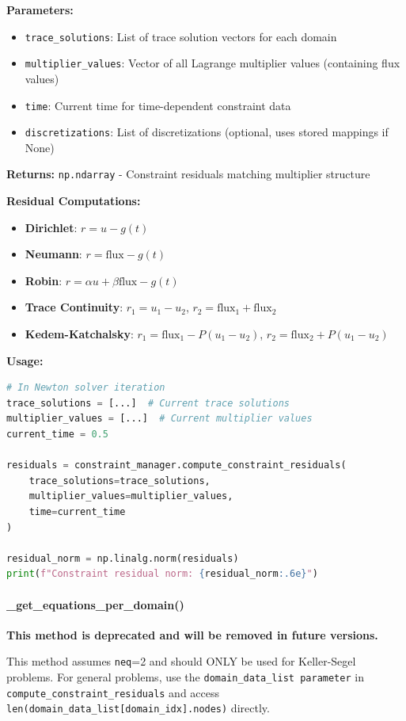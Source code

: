 \textbf{Parameters:}
\begin{itemize}
    \item \texttt{trace\_solutions}: List of trace solution vectors for each domain
    \item \texttt{multiplier\_values}: Vector of all Lagrange multiplier values (containing flux values)
    \item \texttt{time}: Current time for time-dependent constraint data
    \item \texttt{discretizations}: List of discretizations (optional, uses stored mappings if None)
\end{itemize}

\textbf{Returns:} \texttt{np.ndarray} - Constraint residuals matching multiplier structure

\textbf{Residual Computations:}
\begin{itemize}
    \item \textbf{Dirichlet}: $r = u - g(t)$
    \item \textbf{Neumann}: $r = \text{flux} - g(t)$
    \item \textbf{Robin}: $r = \alpha u + \beta \text{flux} - g(t)$
    \item \textbf{Trace Continuity}: $r_1 = u_1 - u_2$, $r_2 = \text{flux}_1 + \text{flux}_2$
    \item \textbf{Kedem-Katchalsky}: $r_1 = \text{flux}_1 - P(u_1-u_2)$, $r_2 = \text{flux}_2 + P(u_1-u_2)$
\end{itemize}

\textbf{Usage:}
\begin{lstlisting}[language=Python, caption=Compute Residuals Usage]
# In Newton solver iteration
trace_solutions = [...]  # Current trace solutions
multiplier_values = [...]  # Current multiplier values
current_time = 0.5

residuals = constraint_manager.compute_constraint_residuals(
    trace_solutions=trace_solutions,
    multiplier_values=multiplier_values,
    time=current_time
)

residual_norm = np.linalg.norm(residuals)
print(f"Constraint residual norm: {residual_norm:.6e}")
\end{lstlisting}

\paragraph{\_get\_equations\_per\_domain()}\leavevmode

\begin{deprecatedbox}
{\bf This method is deprecated and will be removed in future versions.}

This method assumes {\tt neq}=2 and should ONLY be used for Keller-Segel problems.
For general problems, use the {\tt domain\_data\_list parameter} in {\tt  compute\_constraint\_residuals}
and access {\tt len(domain\_data\_list[domain\_idx].nodes)} directly.
\end{deprecatedbox}

